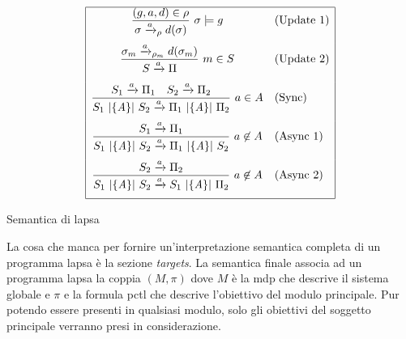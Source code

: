 \begin{table}[htbp!]
$$
	\begin{array}{|cl|}
		\hline
		\displaystyle{\frac{(g,a,d) \in \rho}{\sigma \xrightarrow{a}_\rho d(\sigma)} \mbox{ }\sigma \models g} & \mbox{(Update 1)} \\[.5cm]
		\displaystyle{\frac{\sigma_m \xrightarrow{a}_{\rho_m} d(\sigma_m)}{S \xrightarrow{a} \Pi}\ m \in S} & \mbox{(Update 2)} \\[.5cm]
		\displaystyle{\frac{S_1 \xrightarrow{a} \Pi_1 \quad S_2 \xrightarrow{a} \Pi_2}{S_1 \mbox{ }|{\{\mathit{A}\}}|\mbox{ }S_2 \xrightarrow{a} \Pi_1 \mbox{ }|{\{\mathit{A}\}}|\mbox{ }\Pi_2}\ a \in A} & \mbox{(Sync)} \\[.5cm]
		\displaystyle{\frac{S_1 \xrightarrow{a} \Pi_1}{S_1 \mbox{ }|{\{\mathit{A}\}}|\mbox{ }S_2 \xrightarrow{a} \Pi_1 \mbox{ }|{\{\mathit{A}\}}|\mbox{ }S_2}\ a \not\in A} & \mbox{(Async\ 1)} \\[.5cm]
		\displaystyle{\frac{S_2 \xrightarrow{a} \Pi_2}{S_1 \mbox{ }|{\{\mathit{A}\}}|\mbox{ }S_2 \xrightarrow{a} S_1 \mbox{ }|{\{\mathit{A}\}}|\mbox{ }\Pi_2}\ a \not\in A} & \mbox{(Async\ 2)} \\[.5cm]
		\hline
	\end{array}
$$
	\caption{Semantica di \acs{lapsa}}
	\label{tab:sem:lapsa}
\end{table}

La cosa che manca per fornire un'interpretazione semantica completa di un programma \ac{lapsa} è la sezione \emph{targets}. La semantica finale associa ad un programma \ac{lapsa} la coppia $(M,\pi)$ dove $M$ è la \ac{mdp} che descrive il sistema globale e $\pi$ e la formula \ac{pctl} che descrive l'obiettivo del modulo principale. Pur potendo essere presenti in qualsiasi modulo, solo gli obiettivi del soggetto principale verranno presi in considerazione.

